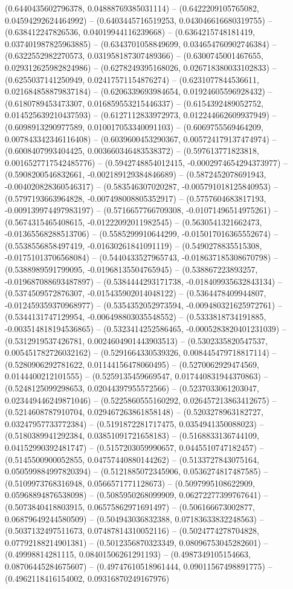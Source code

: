 (0.6440435602796378, 0.04888769385031114) -- (0.6422209105765082, 0.04594292624464992) -- (0.6403445716519253, 0.043046616680319755) -- (0.638412247826536, 0.04019944116239668) -- (0.6364215748181419, 0.037401987825963885) -- (0.6343701058849699, 0.034654760902746384) -- (0.6322552982270573, 0.031958187307489366) -- (0.6300745001467655, 0.029312625982824986) -- (0.6278249395168026, 0.026718380033102833) -- (0.6255037141250949, 0.02417571154876274) -- (0.6231077844536611, 0.021684858879837184) -- (0.6206339693984654, 0.01924605596928432) -- (0.6180789453473307, 0.016859553215446337) -- (0.6154392489052752, 0.014525639210437593) -- (0.6127112833972973, 0.012244662609937949) -- (0.6098913290977589, 0.010017053340091103) -- (0.6069755569464209, 0.007843342346116408) -- (0.6039600453290367, 0.005724179137474974) -- (0.6008407993404425, 0.003660346483538372) -- (0.597613771823818, 0.0016527717542485776) -- (0.5942748854012415, -0.0002974654294373977) -- (0.5908200546832661, -0.002189129384846689) -- (0.5872452078691943, -0.004020828360546317) -- (0.583546307020287, -0.005791018125840953) -- (0.5797193663964828, -0.007498008805352917) -- (0.5757604683817193, -0.009139974497983197) -- (0.5716657766709308, -0.01071496514975261) -- (0.5674315465408615, -0.01222092011982545) -- (0.5630541321662473, -0.01365568288513706) -- (0.5585299910644299, -0.015017016365552674) -- (0.5538556858497419, -0.01630261841091119) -- (0.5490278835515308, -0.01751013706568084) -- (0.5440433527965743, -0.018637185308670798) -- (0.5388989591799095, -0.01968135504765945) -- (0.538867223893257, -0.019687088693487897) -- (0.5384444293171738, -0.018409935632843134) -- (0.5374509572876307, -0.015435902014048122) -- (0.5364478409944807, -0.012459359370968977) -- (0.5354352052973594, -0.009480321625972761) -- (0.5344131747129954, -0.006498803035548552) -- (0.5333818734191885, -0.003514818194536865) -- (0.5323414252586465, -0.0005283820401231039) -- (0.5312919537426781, 0.0024604901443903513) -- (0.5302335820547537, 0.005451782726032162) -- (0.5291664330539326, 0.008445479718817114) -- (0.5280906292781622, 0.01144156478060495) -- (0.5270062929474569, 0.0144400212101555) -- (0.5259135459669547, 0.017440831944370863) -- (0.5248125099298653, 0.02044397955572566) -- (0.5237033061203047, 0.023449446249871046) -- (0.5225860555160292, 0.026457213863412675) -- (0.5214608787910704, 0.029467263861858148) -- (0.5203278963182727, 0.03247957733772384) -- (0.5191872281717475, 0.0354941350088023) -- (0.5180389941292384, 0.03851091721658183) -- (0.5168833136744109, 0.04152990392481747) -- (0.5157203059990657, 0.0445510747182457) -- (0.5145500900052855, 0.04757440880144262) -- (0.5133727843075164, 0.050599884997820394) -- (0.5121885072345906, 0.0536274817487585) -- (0.5109973768316948, 0.0566571771128673) -- (0.5097995108622909, 0.05968894876538098) -- (0.5085950268099909, 0.06272277399767641) -- (0.5073840418803915, 0.06575862971691497) -- (0.506166673002877, 0.06879649244580509) -- (0.504943036832388, 0.07183633832248563) -- (0.5037132497511673, 0.07487814310052116) -- (0.5024774278704828, 0.07792188214901381) -- (0.5012356870323349, 0.08096753045282601) -- (0.49998814281115, 0.08401506261291193) -- (0.4987349105154663, 0.08706445284675607) -- (0.49747610518961444, 0.09011567498891775) -- (0.4962118416154002, 0.09316870249167976) 